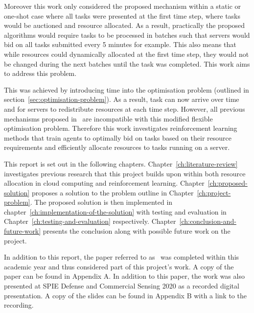 Moreover this work only considered the proposed mechanism within a static or one-shot case where all tasks were presented
at the first time step, where tasks would be auctioned and resource allocated. As a result, practically the proposed
algorithms would require tasks to be processed in batches such that servers would bid on all tasks submitted every 5
minutes for example. This also means that while resources could dynamically allocated at the first time step, they
would not be changed during the next batches until the task was completed. This work aims to address this problem.

This was achieved by introducing time into the optimisation problem (outlined in section~\ref{sec:optimisation-problem}).
As a result, task can now arrive over time and for servers to redistribute resources at each time step. However, all
previous mechanisms proposed in~\cite{FlexibleResourceAllocation} are incompatible with this modified flexible
optimisation problem. Therefore this work investigates reinforcement learning methods that train agents to optimally
bid on tasks based on their resource requirements and efficiently allocate resources to tasks running on a server.

This report is set out in the following chapters. Chapter~\ref{ch:literature-review} investigates previous research
that this project builds upon within both resource allocation in cloud computing and reinforcement learning.
Chapter~\ref{ch:proposed-solution} proposes a solution to the problem outline in Chapter~\ref{ch:project-problem}.
The proposed solution is then implemented in chapter~\ref{ch:implementation-of-the-solution} with testing and
evaluation in Chapter~\ref{ch:testing-and-evaluation} respectively.
Chapter~\ref{ch:conclusion-and-future-work} presents the conclusion along with possible future work on the project.

In addition to this report, the paper referred to as~\cite{FlexibleResourceAllocation} was completed within this
academic year and thus considered part of this project's work. A copy of the paper can be found in
Appendix A. In addition to this paper, the work was also presented at SPIE Defense and Commercial
Sensing 2020 as a recorded digital presentation. A copy of the slides can be found in
Appendix B with a link to the recording.
